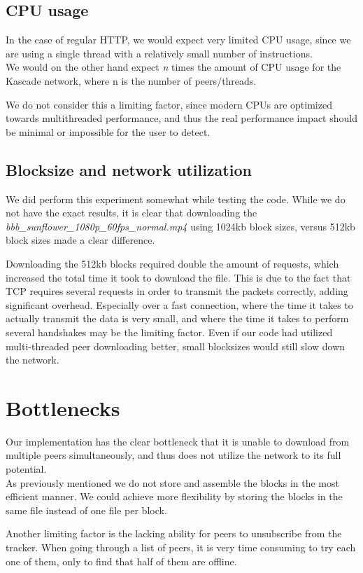\documentclass{acm_proc_article-sp}
\begin{document}
\subsection{CPU usage}
In the case of regular HTTP, we would expect very limited CPU usage, since we are using a single thread with a relatively small number of instructions. \\
We would on the other hand expect \textit{n} times the amount of CPU usage for the Kascade network, where n is the number of peers/threads.

We do not consider this a limiting factor, since modern CPUs are optimized towards multithreaded performance, and thus the real performance impact should be minimal or impossible for the user to detect.

\subsection{Blocksize and network utilization}
We did perform this experiment somewhat while testing the code. While we do not have the exact results, it is clear that downloading the \textit{bbb\_sunflower\_1080p\_60fps\_normal.mp4} using 1024kb block sizes, versus 512kb block sizes made a clear difference. 

Downloading the 512kb blocks required double the amount of requests, which increased the total time it took to download the file. This is due to the fact that TCP requires several requests in order to transmit the packets correctly, adding significant overhead. Especially over a fast connection, where the time it takes to actually transmit the data is very small, and where the time it takes to perform several handshakes may be the limiting factor.
Even if our code had utilized multi-threaded peer downloading better, small blocksizes would still slow down the network.

\section{Bottlenecks}
Our implementation has the clear bottleneck that it is unable to download from multiple peers simultaneously, and thus does not utilize the network to its full potential.\\
As previously mentioned we do not store and assemble the blocks in the most efficient manner. We could achieve more flexibility by storing the blocks in the same file instead of one file per block.

Another limiting factor is the lacking ability for peers to unsubscribe from the tracker. When going through a list of peers, it is very time consuming to try each one of them, only to find that half of them are offline. 
\end{document}
